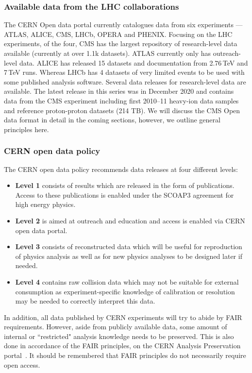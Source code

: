\documentclass[10pt]{article}
\begin{document}
\subsubsection{Available data from the LHC collaborations}
%
The CERN Open data portal currently catalogues data from six experiments ---  ATLAS, ALICE, CMS, LHCb,  OPERA and PHENIX.  Focusing on the LHC experiments, of the four, CMS has the largest repository of research-level data available (currently at over 1.1k datasets).  ATLAS currently only has outreach-level data.  ALICE has released 15 datasets and documentation from 2.76\,TeV and 7\,TeV runs.  Whereas LHCb has 4 datasets of very limited events to be used with some published analysis software.  Several data releases for research-level data are available. The latest release in this series was in December 2020 and contains data from the CMS experiment including first 2010–11 heavy-ion data samples and reference proton-proton datasets (214 TB).  We will discuss the CMS Open data format in detail in the coming sections, however, we outline general principles here.


\subsubsection{CERN open data policy}
%
The CERN open data policy recommends data releases at four different levels:
\begin{itemize}
	\item {\bf Level 1} consists of results which are released in the form of publications. Access to these publications is enabled under the SCOAP3 agreement for high energy physics.
	\item {\bf Level 2} is aimed at outreach and education and access is enabled via CERN open data portal.
	\item {\bf Level 3} consists of reconstructed data which will be useful for reproduction of physics analysis as well as for new physics analyses to be designed later if needed.  
	\item {\bf Level 4} contains raw collision data which may not be suitable for external consumption as  experiment-specific knowledge of calibration or resolution may be needed to correctly interpret this data.
\end{itemize}
%
In addition, all data published by CERN experiments will try to abide by FAIR requirements.  However, aside from publicly available data, some amount of internal or ``restricted" analysis knowledge needs to be preserved. This is also done in accordance of the FAIR principles, on the CERN Analysis Preservation portal~\cite{restricted}. It should be remembered that FAIR principles do not necessarily require open access.  
\end{document}
